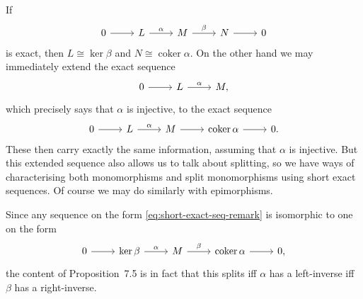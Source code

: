 \documentclass[article, a4paper, 11pt, oneside]{memoir}
\numberwithin{equation}{chapter}
\DeclareMathOperator{\coker}{coker}
\theoremstyle{nonumberplain}
\begin{document}
\begin{remarkbreak}
    \label{rem:split-exact-sequences}
    If
    \begin{equation}
        \label{eq:short-exact-seq-remark}
        \begin{tikzcd}
            0
                \ar[r]
            & L
                \ar[r, "\alpha"]
            & M
                \ar[r, "\beta"]
            & N
                \ar[r]
            & 0
        \end{tikzcd}
    \end{equation}
    is exact, then $L \cong \ker\beta$ and $N \cong \coker\alpha$. On the other hand we may immediately extend the exact sequence
    \begin{equation*}
        \begin{tikzcd}
            0
                \ar[r]
            & L
                \ar[r, "\alpha"]
            & M,
        \end{tikzcd}
    \end{equation*}
    which precisely says that $\alpha$ is injective, to the exact sequence
    \begin{equation*}
        \begin{tikzcd}
            0
                \ar[r]
            & L
                \ar[r, "\alpha"]
            & M
                \ar[r]
            & \coker\alpha
                \ar[r]
            & 0.
        \end{tikzcd}
    \end{equation*}
    These then carry exactly the same information, assuming that $\alpha$ is injective. But this extended sequence also allows us to talk about splitting, so we have ways of characterising both monomorphisms and split monomorphisms using short exact sequences. Of course we may do similarly with epimorphisms.

    Since any sequence on the form \cref{eq:short-exact-seq-remark} is isomorphic to one on the form
    \begin{equation*}
        \begin{tikzcd}
            0
                \ar[r]
            & \ker\beta
                \ar[r, "\alpha"]
            & M
                \ar[r, "\beta"]
            & \coker\alpha
                \ar[r]
            & 0,
        \end{tikzcd}
    \end{equation*}
    the content of Proposition~7.5 is in fact that this splits iff $\alpha$ has a left-inverse iff $\beta$ has a right-inverse.
\end{remarkbreak}
\end{document}
